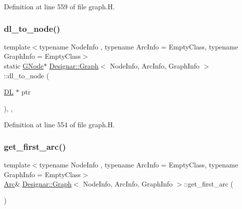 Definition at line 559 of file graph.\+H.

\mbox{\label{class_designar_1_1_graph_ab6f1de18d2ec0c537fc1daa5b4a42e01}} 
\subsubsection{\texorpdfstring{dl\+\_\+to\+\_\+node()}{dl\_to\_node()}}
{\footnotesize\ttfamily template$<$typename Node\+Info , typename Arc\+Info  = Empty\+Class, typename Graph\+Info  = Empty\+Class$>$ \\
static \hyperlink{class_designar_1_1_graph_a7e61951db0bb9bfa8a2e317440d4e17f}{G\+Node}$\ast$ \hyperlink{class_designar_1_1_graph}{Designar\+::\+Graph}$<$ Node\+Info, Arc\+Info, Graph\+Info $>$\+::dl\+\_\+to\+\_\+node (\begin{DoxyParamCaption}\item[{\hyperlink{class_designar_1_1_d_l}{DL} $\ast$}]{ptr }\end{DoxyParamCaption})\hspace{0.3cm}{\ttfamily [inline]}, {\ttfamily [static]}, {\ttfamily [protected]}}



Definition at line 554 of file graph.\+H.

\mbox{\label{class_designar_1_1_graph_a6829f963f0db1fffbc535557f39ed877}} 
\subsubsection{\texorpdfstring{get\+\_\+first\+\_\+arc()}{get\_first\_arc()}\hspace{0.1cm}{\footnotesize\ttfamily [1/2]}}
{\footnotesize\ttfamily template$<$typename Node\+Info , typename Arc\+Info  = Empty\+Class, typename Graph\+Info  = Empty\+Class$>$ \\
\hyperlink{class_designar_1_1_graph_a74c730ef4ce2d20f998d72bd25c2b5bf}{Arc}\& \hyperlink{class_designar_1_1_graph}{Designar\+::\+Graph}$<$ Node\+Info, Arc\+Info, Graph\+Info $>$\+::get\+\_\+first\+\_\+arc (\begin{DoxyParamCaption}{ }\end{DoxyParamCaption})\hspace{0.3cm}{\ttfamily [inline]}}



